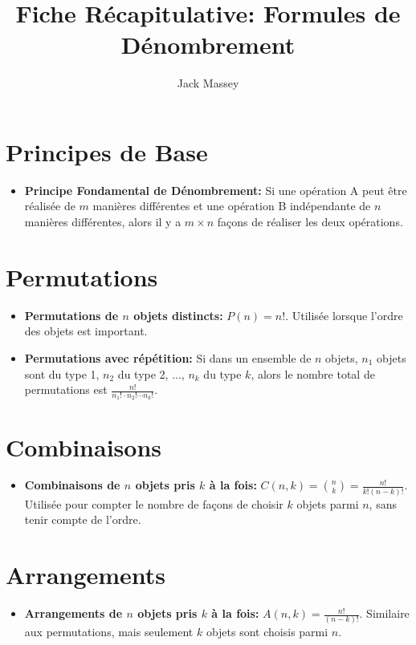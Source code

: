 \documentclass{article}
\title{Fiche Récapitulative: Formules de Dénombrement}
\author{Jack Massey}
\date{}
\begin{document}
\maketitle

\section{Principes de Base}
\begin{itemize}
    \item \textbf{Principe Fondamental de Dénombrement:} Si une opération A peut être réalisée de \(m\) manières différentes et une opération B indépendante de \(n\) manières différentes, alors il y a \(m \times n\) façons de réaliser les deux opérations.
\end{itemize}

\section{Permutations}
\begin{itemize}
    \item \textbf{Permutations de \(n\) objets distincts:} \(P(n) = n!\). Utilisée lorsque l'ordre des objets est important.
    \item \textbf{Permutations avec répétition:} Si dans un ensemble de \(n\) objets, \(n_1\) objets sont du type 1, \(n_2\) du type 2, ..., \(n_k\) du type \(k\), alors le nombre total de permutations est \(\frac{n!}{n_1! \cdot n_2! \cdots n_k!}\).
\end{itemize}

\section{Combinaisons}
\begin{itemize}
    \item \textbf{Combinaisons de \(n\) objets pris \(k\) à la fois:} \(C(n, k) = \binom{n}{k} = \frac{n!}{k!(n-k)!}\). Utilisée pour compter le nombre de façons de choisir \(k\) objets parmi \(n\), sans tenir compte de l'ordre.
\end{itemize}

\section{Arrangements}
\begin{itemize}
    \item \textbf{Arrangements de \(n\) objets pris \(k\) à la fois:} \(A(n, k) = \frac{n!}{(n-k)!}\). Similaire aux permutations, mais seulement \(k\) objets sont choisis parmi \(n\).
\end{itemize}
\end{document}
